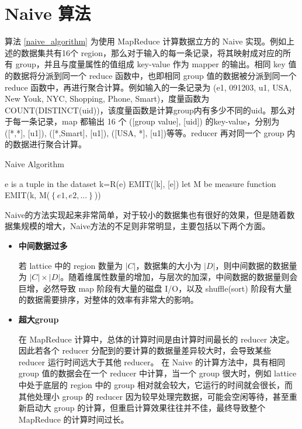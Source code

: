 \section{Naive 算法}

算法 \ref{naive_algorithm} 为使用 MapReduce 计算数据立方的 Naive 实现。例如上述的数据集共有16个 region，那么对于输入的每一条记录，将其映射成对应的所有 group，并且与度量属性的值组成 key-value 作为 mapper 的输出。相同 key 值的数据将分派到同一个 reduce 函数中，也即相同 group 值的数据被分派到同一个 reduce 函数中，再进行聚合计算。例如输入的一条记录为 (e1, 091203, u1, USA, New Youk, NYC, Shopping, Phone, Smart)，度量函数为 COUNT(DISTINCT(uid))，该度量函数是计算group内有多少不同的uid。那么对于每一条记录，map 都输出 16 个 ([group value], [uid]) 的key-value，分别为([*,*], [u1]), ([*,Smart], [u1]), ([USA, *], [u1])等等。reducer 再对同一个 group 内的数据进行聚合计算。

{\renewcommand\baselinestretch{1} 
\begin{algorithm}[!ht]
\caption{Naive Algorithm}
\label{naive_algorithm}
{\fontfamily{\familydefault}\selectfont

	\begin{algorithmic}[1] %
    	\State e is a tuple in the dataset
        	\State k=R(e)
        	\State EMIT([k], [e])
        \EndFor
   	 \EndFunction
     \State
     	\State let M be measure function
        \State EMIT(k, M($\left\{ e1,e2,...\right\}$))
     \EndFunction
	\end{algorithmic}
}
\end{algorithm}
\par}

Naive的方法实现起来非常简单，对于较小的数据集也有很好的效果，但是随着数据集规模的增大，Naive方法的不足则非常明显，主要包括以下两个方面。

\begin{itemize}

\item \textbf{中间数据过多}

若 lattice 中的 region 数量为 $|C|$，数据集的大小为 $|D|$，则中间数据的数据量为 $|C|\times |D|$。随着维属性数量的增加，与层次的加深，中间数据的数据量则会巨增，必然导致 map 阶段有大量的磁盘 I/O，以及 shuffle(sort) 阶段有大量的数据需要排序，对整体的效率有非常大的影响。

\item \textbf{超大group}

在 MapReduce 计算中，总体的计算时间是由计算时间最长的 reducer 决定。因此若各个 reducer 分配到的要计算的数据量差异较大时，会导致某些 reducer 运行时间远大于其他 reducer。 在 Naive 的计算方法中，具有相同 group 值的数据会在一个 reducer 中计算，当一个 group 很大时，例如 lattice 中处于底层的 region 中的 group 相对就会较大，它运行的时间就会很长，而其他处理小 group 的 reducer 因为较早处理完数据，可能会空闲等待，甚至重新启动大 group 的计算，但重启计算效果往往并不佳，最终导致整个 MapReduce 的计算时间过长。

\end{itemize}


